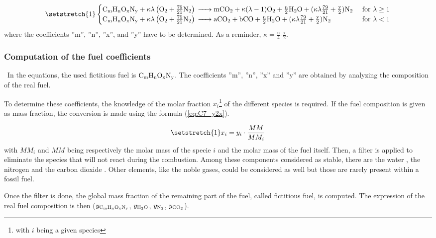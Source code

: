 \begin{equation}
    \setstretch{1}
    \begin{cases}
        \ce{C_{\text{m}}H_{\text{n}}O_{\text{x}}N_{\text{y}} +}\kappa\lambda \left(\ce{O2}+\frac{79}{21}\ce{N2}\right) \ce{-> mCO2 +} \kappa(\lambda-1)\ce{O2 + \frac{n}{2}H2O +} (\kappa\lambda\frac{79}{21} + \frac{\text{y}}{2})\ce{N2} & \text{ for \(\lambda\geq 1\)} \\
        \ce{C_{\text{m}}H_{\text{n}}O_{\text{x}}N_{\text{y}} +}\kappa\lambda \left(\ce{O2}+\frac{79}{21}\ce{N2}\right) \ce{-> aCO2 + bCO + \frac{n}{2}H2O} + (\kappa\lambda\frac{79}{21} + \frac{\text{y}}{2})\ce{N2}                      & \text{ for \(\lambda< 1\)}
    \end{cases}\label{eq:C7_chemgeng01}
\end{equation}
where the coefficients ''m'', ''n'', ''x'', and ''y'' have to be determined. As a reminder, $\kappa=\frac{\text{n}}{4}$-$\frac{\text{x}}{2}$. 

\subsubsection{Computation of the fuel coefficients}
\quad\ In the equations, the used fictitious fuel is $\ce{C_{\text{m}}H_{\text{n}}O_{\text{x}}N_{\text{y}}}$. The coefficients ''m'', ''n'', ''x'' and ''y'' are obtained by analyzing the composition of the real fuel.

To determine these coefficients, the knowledge of the molar fraction $x_i$\footnote{with $i$ being a given species} of the different species is required. If the fuel composition is given as mass fraction, the conversion is made using the formula (\ref{eq:C7_y2x}).

\begin{equation}
\setstretch{1}
    x_i = y_i\cdot \frac{MM}{MM_i}\label{eq:C7_y2x}
\end{equation}
with $MM_i$ and $MM$ being respectively the molar mass of the specie $i$ and the molar mass of the fuel itself.
Then, a filter is applied to eliminate the species that will not react during the combustion. Among these components considered as stable, there are the water , the nitrogen  and the carbon dioxide . Other elements, like the noble gases, could be considered as well but those are rarely present within a fossil fuel.

Once the filter is done, the global mass fraction of the remaining part of the fuel, called fictitious fuel, is computed. The expression of the real fuel composition is then  ($y_{\ce{C_{\text{m}}H_{\text{n}}O_{\text{x}}N_{\text{y}}}}$, $y_{\ce{H2O}}$, $y_{\ce{N2}}$, $y_{\ce{CO2}}$).

